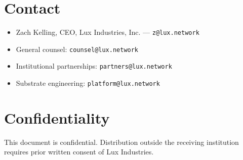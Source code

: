 \documentclass[11pt,letterpaper]{article}
\begin{document}
\section{Contact}

\begin{itemize}
\item Zach Kelling, CEO, Lux Industries, Inc. --- \texttt{z@lux.network}
\item General counsel: \texttt{counsel@lux.network}
\item Institutional partnerships: \texttt{partners@lux.network}
\item Substrate engineering: \texttt{platform@lux.network}
\end{itemize}

\section*{Confidentiality}

This document is confidential. Distribution outside the receiving institution requires prior written consent of Lux Industries.
\end{document}
